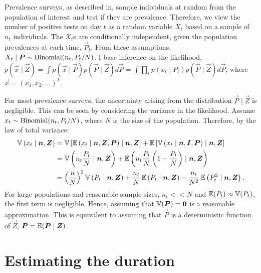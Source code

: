 \documentclass[thesis.tex]{subfiles}
\begin{document}
Prevalence surveys, as described in, sample individuals at random from the population of interest and test if they are prevalence.
Therefore, we view the number of positive tests on day $t$ as a random variable $X_t$ based on a sample of $n_t$ individuals.
The $X_t$s are conditionally independent, given the population prevalences at each time, $\vec{P}_t$. 
From these assumptions, $X_t \mid \bm{P} \sim \operatorname{Binomial}(n_t, P_t / N)$.
I base inference on the likelihood, $p(\vec{x} \mid \vec{Z}) = \int p(\vec{x} \mid \vec{P}) p(\vec{P} \mid \vec{Z}) d\vec{P} = \int \prod_t p(x_t \mid P_t) p(\vec{P} \mid \vec{Z}) d\vec{P}$, where $\vec{x} = (x_1, x_2, \dots)^T$.

For most prevalence surveys, the uncertainty arising from the distribution $\vec{P} \mid \vec{Z}$ is negligible.
This can be seen by considering the variance in the likelihood.
Assume $x_t \sim \operatorname{Binomial}(n_t, P_t / N)$, where $N$ is the size of the population.
Therefore, by the law of total variance:
\begin{align}
  \operatorname{\mathbb{V}}\left( x_t \mid \bm{n}, \bm{Z} \right)
    &= \operatorname{\mathbb{V}}\left[\operatorname{\mathbb{E}}\left( x_t \mid \bm{n}, \bm{Z}, \bm{P} \right) \mid \bm{n}, \bm{Z} \right] + \operatorname{\mathbb{E}}\left[\operatorname{\mathbb{V}}\left( x_t \mid \bm{n}, \bm{I}, \bm{P} \right) \mid \bm{n}, \bm{Z} \right] \\
    &= \operatorname{\mathbb{V}}\left( n_t \frac{P_t}{N} \mid \bm{n}, \bm{Z} \right) + \operatorname{\mathbb{E}}\left( n_t \frac{P_t}{N} \left(1 - \frac{P_t}{N} \right) \mid \bm{n}, \bm{Z} \right) \\
    &= \left( \frac{n}{N} \right)^2 \operatorname{\mathbb{V}}\left(P_t \mid \bm{n}, \bm{Z} \right) + \frac{n_t}{N} \operatorname{\mathbb{E}}\left(P_t \mid \bm{n}, \bm{Z} \right)  - \frac{n_t}{N^2} \operatorname{\mathbb{E}}\left(P_t^2 \mid \bm{n}, \bm{Z} \right).
\end{align}
For large populations and reasonable sample sizes, $n_t << N$ and $\operatorname{\mathbb{E}}(P_t) \approx \operatorname{\mathbb{V}}(P_t)$, the first term is negligible.
Hence, assuming that $\operatorname{\mathbb{V}}(\bm{P}) = \bm{0}$ is a reasonable approximation.
This is equivalent to assuming that $\vec{P}$ is a deterministic function of $\vec{Z}$, $\bm{P} = \operatorname{\mathbb{E}}( \bm{P} \mid \bm{Z})$.


\section{Estimating the duration} \label{inprev:sec:duration}
\end{document}
